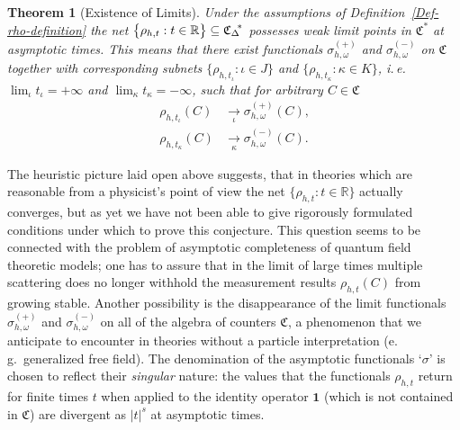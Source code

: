 \documentclass[11pt,twoside,openright]{report}
\theoremstyle{definition}
\theoremstyle{plain}
\newtheorem{The}[Def]{Theorem}
\theoremstyle{remark}
\theoremstyle{assumption}
\newcommand{\bset}[1]{\bigl\{ #1 \bigr\}}
\newcommand{\abs}[1]{\lvert #1 \rvert}
\newcommand{\Rbb}{\mathbb{R}}
\newcommand{\Cfrak}{\mathfrak{C}}
\newcommand{\unit}{\mathbf{1}}
\newcommand{\Cstar}{\mathfrak{C}^*}
\newcommand{\CDstar}{{\mathfrak{C}_\Delta}^{\negthickspace *}}
\begin{document}
\begin{The}[Existence of Limits]
  \label{The-singular-limits}
  Under the assumptions of Definition~\ref{Def-rho-definition} the net
  $\bset{\rho_{h , t} : t \in \Rbb} \subseteq \CDstar$ possesses weak
  limit points in $\Cstar$ at asymptotic times. This means that there
  exist functionals $\sigma_{h , \omega}^{( + )}$ and $\sigma_{h ,
  \omega}^{( - )}$ on $\Cfrak$ together with corresponding subnets
  $\bset{\rho_{h , t_\iota} : \iota \in J}$ and $\bset{\rho_{h ,
  t_\kappa} : \kappa \in K}$, i.\,e.~$\lim_\iota t_\iota = + \infty$
  and $\lim_\kappa t_\kappa = - \infty$, such that for arbitrary $C
  \in \Cfrak$
  \begin{subequations}
    \label{eq-singular-limits}
    \begin{align}
      \rho_{h , t_\iota} ( C ) & \underset{\iota}{\longrightarrow}
      \sigma_{h , \omega}^{( + )} ( C ) \text{,} \\
      \rho_{h , t_\kappa} ( C ) & \underset{\kappa}{\longrightarrow}
      \sigma_{h , \omega}^{( - )} ( C ) \text{.}
    \end{align}
  \end{subequations}
\end{The}

The heuristic picture laid open above suggests, that in theories which
are reasonable from a physicist's point of view the net $\bset{\rho_{h
, t} : t \in \Rbb}$ actually converges, but as yet we have not been
able to give rigorously formulated conditions under which to prove
this conjecture. This question seems to be connected with the problem
of asymptotic completeness of quantum field theoretic models; one has
to assure that in the limit of large times multiple scattering does no
longer withhold the measurement results $\rho_{h , t} ( C )$ from
growing stable. Another possibility is the disappearance of the limit
functionals $\sigma_{h , \omega}^{( + )}$ and $\sigma_{h , \omega}^{(
- )}$ on all of the algebra of counters $\Cfrak$, a phenomenon that we
anticipate to encounter in theories without a particle interpretation
(e.\,g.~generalized free field). The denomination of the asymptotic
functionals `$\sigma$' is chosen to reflect their \emph{singular}
nature: the values that the functionals $\rho_{h , t}$ return for
finite times $t$ when applied to the identity operator $\unit$ (which
is not contained in $\Cfrak$) are divergent as $\abs{t}^s$ at
asymptotic times.
\end{document}
